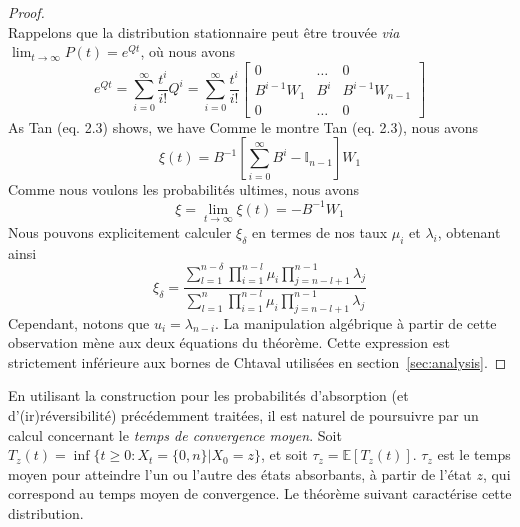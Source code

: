 \documentclass[letterpaper,twocolumn,10pt]{article}
\newcommand\ddfrac[2]{\frac{\displaystyle #1}{\displaystyle #2}}
\theoremstyle{definition}
\begin{document}
\begin{appendices}
\begin{proof}
\[\]
Rappelons que la distribution stationnaire peut être trouvée \emph{via} $\lim_{t \rightarrow \infty} P(t) = e^{Qt}$, où nous avons
\[
    e^{Qt} = \sum_{i = 0}^{\infty} \frac{t^i}{i!} Q^i = \sum_{i = 0}^{\infty} \frac{t^i}{i!}
    \begin{bmatrix}
        0 & \dots & 0\\
        B^{i-1}W_1 & B^i & B^{i-1}W_{n-1}\\
        0 & \dots & 0
    \end{bmatrix}
\]
As Tan (eq. 2.3) shows, we have
Comme le montre Tan (eq. 2.3), nous avons
\[
    \xi(t) = B^{-1}\left[\sum_{i = 0}^{\infty} B^i  - \mathbb{I}_{n-1} \right] W_1
\]
Comme nous voulons les probabilités ultimes, nous avons 
\[
    \xi = \lim_{t \rightarrow \infty} \xi(t) = -B^{-1}W_1
\]
Nous pouvons explicitement calculer $\xi_\delta$ en termes de nos taux $\mu_i$ et $\lambda_i$, obtenant ainsi
\[
    \xi_\delta = \ddfrac{\sum_{l = 1}^{n-\delta}\prod_{i = 1}^{n-l}\mu_i \prod_{j = n-l+1}^{n-1}\lambda_j}{\sum_{l = 1}^{n}\prod_{i = 1}^{n-l}\mu_i \prod_{j = n-l+1}^{n-1}\lambda_j}
\]
Cependant, notons que $u_{i} = \lambda_{n-i}$. La manipulation algébrique à partir de cette observation mène aux deux équations du théorème. Cette expression est strictement inférieure aux bornes de Chtaval utilisées en section~\ref{sec:analysis}.
\end{proof}

En utilisant la construction pour les probabilités d'absorption (et d'(ir)réversibilité) précédemment traitées, il est naturel de poursuivre par un calcul concernant le \emph{temps de convergence moyen}.
Soit $T_{z}(t) = \inf \{t \geq 0 : X_t = \{0, n\} | X_0 = z\}$, et soit $\tau_z = \mathbb{E}[T_{z}(t)]$. $\tau_z$ est le temps moyen pour atteindre l'un ou l'autre des états absorbants, à partir de l'état $z$, qui correspond au temps moyen de convergence. Le théorème suivant caractérise cette distribution.


\end{appendices}
\end{document}
